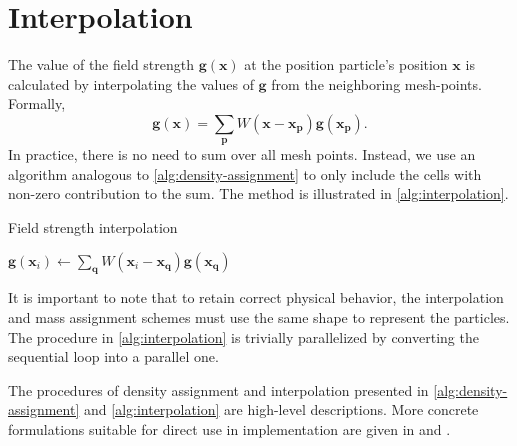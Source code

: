\section{Interpolation}
The value of the field strength $\mathbf{g}(\mathbf{x})$ at the position particle's position $\mathbf{x}$ is calculated by interpolating the values of $\mathbf{g}$ from the neighboring mesh-points.
Formally,
\begin{equation*}
    \mathbf{g}(\mathbf{x}) = \sum_\mathbf{p} W(\mathbf{x} - \mathbf{x}_\mathbf{p}) \mathbf{g}(\mathbf{x}_\mathbf{p}).
\end{equation*}
In practice, there is no need to sum over all mesh points.
Instead, we use an algorithm analogous to \autoref{alg:density-assignment} to only include the cells with non-zero contribution to the sum.
The method is illustrated in \autoref{alg:interpolation}.
\begin{algorithm}
    \caption{Field strength interpolation}\label{alg:interpolation}
    \begin{algorithmic}[1]
        \State $\mathbf{g}(\mathbf{x}_i) \gets \sum_\mathbf{q} W(\mathbf{x}_i - \mathbf{x}_\mathbf{q}) \mathbf{g}(\mathbf{x}_\mathbf{q})$
        \EndFor
        \EndFor
    \end{algorithmic}
\end{algorithm}
It is important to note that to retain correct physical behavior, the interpolation and mass assignment schemes must use the same shape to represent the particles.
The procedure in \autoref{alg:interpolation} is trivially parallelized by converting the sequential loop into a parallel one.

The procedures of density assignment and interpolation presented in \autoref{alg:density-assignment} and \autoref{alg:interpolation} are high-level descriptions.
More concrete formulations suitable for direct use in implementation are given in \cite{Hockney1988} and \cite{Kravtsov2002PM}.
